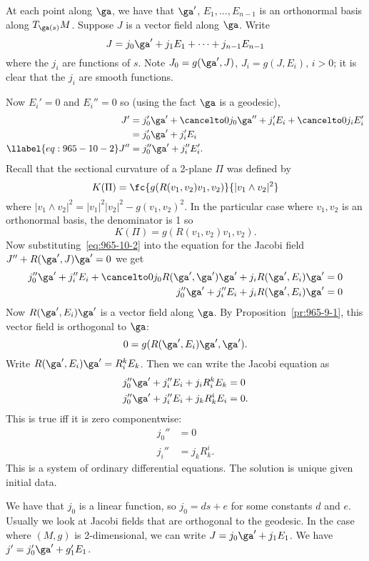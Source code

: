 
At each point along $\ga$, we have that $\ga'$, $E_1, \ldots,E_{n-1}$ is an orthonormal basis along $T_{\ga(s)}M$. Suppose $J$ is a vector field along $\ga$. Write 
\[J=j_0\ga'+j_1E_1+\cdots +j_{n-1}E_{n-1}\]
 where the $j_i$ are functions of $s$. Note $J_0=g(\ga',J)$, $J_i=g(J,E_i),\,i>0$; it is clear that the $j_i$ are smooth functions.

Now $E_i'=0$ and $E_i''=0$ so (using the fact $\ga$ is a geodesic),
\begin{align}
\nonumber
J' &= j_0'\ga'+\cancelto0{j_0\ga''}+j_i'E_i+\cancelto0{j_iE_i'}\\
\nonumber
&= j_0'\ga'+j_i'E_i\\
\llabel{eq:965-10-2}
J''&=j_0''\ga'+j_i''E_i'.
\end{align}
Recall that the sectional curvature of a 2-plane $\Pi$ was defined by 
\[
K(\Pi)=\fc{g(R(v_1,v_2)v_1,v_2)}{|v_1\wedge v_2|^2}
\]
where $|v_1\wedge v_2|^2=|v_1|^2|v_2|^2-g(v_1,v_2)^2$. In the particular case where $v_1,v_2$ is an orthonormal basis, the denominator is 1 so
\[
K(\Pi)=g(R(v_1,v_2)v_1,v_2).
\]
Now substituting~\eqref{eq:965-10-2} into the equation for the Jacobi field $J''+R(\ga',J)\ga'=0$ we get
\begin{align*}
j_0''\ga' +j_i''E_i+\cancelto 0{j_0R(\ga',\ga')\ga'}+j_i R(\ga',E_i)\ga'&=0\\
j_0''\ga' +j_i''E_i+j_i R(\ga',E_i)\ga'&=0
\end{align*}
Now $R(\ga',E_i)\ga'$ is a vector field along $\ga$. By Proposition~\ref{pr:965-9-1}, this vector field is orthogonal to $\ga$:
\[
0=g(R(\ga',E_i)\ga',\ga').
\]
Write $R(\ga',E_i)\ga'=R_i^k E_k$. Then we can write the Jacobi equation as
\begin{align*}
j_0''\ga'+j_i'' E_i+j_iR_i^kE_k&=0\\
j_0''\ga'+j_i'' E_i+j_kR_k^iE_i&=0.
\end{align*}
This is true iff it is zero componentwise:
\begin{align*}
j_0''&=0\\ 
j_i''&=j_kR_k^i.
\end{align*}
This is a system of ordinary differential equations. The solution is unique given initial data. %

We have that $j_0$ is a linear function, so $j_0=ds+e$ for some constants $d$ and $e$. Usually we look at Jacobi fields that are orthogonal to the geodesic. In the case where $(M,g)$ is 2-dimensional, we can write $J=j_0\ga'+j_1E_1$. We have $j'=j_0'\ga'+g_1'E_1$. %

